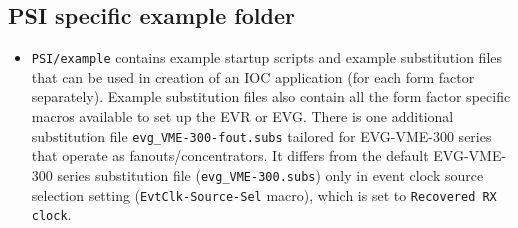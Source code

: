 \documentclass[12pt,a4paper]{article}
\begin{document}
\subsection{PSI specific example folder}\label{sec:PSI specifics}
\begin{itemize}
\item 
	\texttt{PSI/example} contains example startup scripts and example substitution files that can be used in creation of an IOC application (for each form factor separately). Example substitution files also contain all the form factor specific macros available to set up the EVR or EVG. There is one additional substitution file \texttt{evg\_VME-300-fout.subs} tailored for EVG-VME-300 series that operate as fanouts/concentrators. It differs from the default EVG-VME-300 series substitution file (\texttt{evg\_VME-300.subs}) only in event clock source selection setting (\texttt{EvtClk-Source-Sel} macro), which is set to \texttt{Recovered RX clock}.
\end{itemize}

\end{document}
